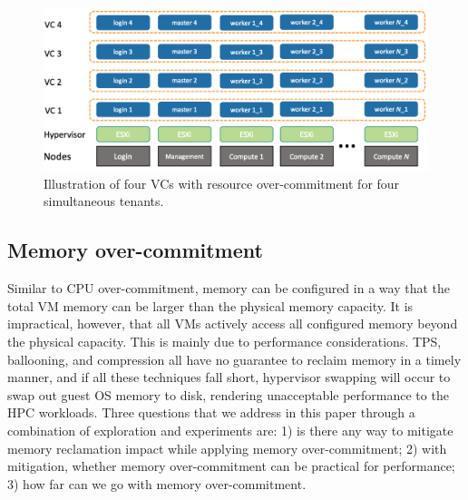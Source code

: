 
\begin{figure}[!t]
   \begin{center}
       \includegraphics[width=\columnwidth]{Figures/architecture}
   \end{center}
   \caption{Illustration of four VCs with resource over-commitment for four simultaneous tenants.}
   \label{fig:architecture}
 \end{figure}

\subsection{Memory over-commitment}
Similar to CPU over-commitment, memory can be configured in a way that the total VM memory can be 
larger than the physical memory capacity. It is impractical, however, that all VMs actively access all configured 
memory beyond the physical capacity. This is mainly due to performance considerations. TPS, ballooning, and 
compression all have no guarantee to reclaim memory in a timely manner, and if all these techniques fall short, 
hypervisor swapping will occur to swap out guest OS memory to disk, rendering unacceptable performance to 
the HPC workloads. Three questions that we address in this paper through a combination of exploration and experiments are: 1) is there any way to mitigate 
memory reclamation impact while applying memory over-commitment; 
2) with mitigation, whether memory over-commitment 
can be practical for performance; 3) how far can we go with memory over-commitment.

